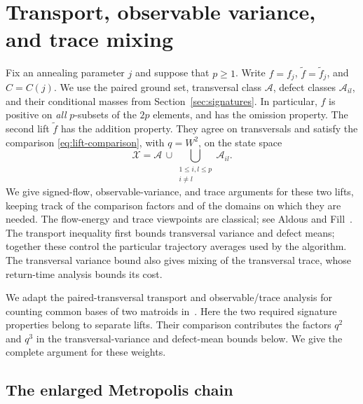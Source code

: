 \section{Transport, observable variance, and trace mixing}
\label{sec:transport}

Fix an annealing parameter $j$ and suppose that $p\geq 1$.
Write $f=f_j$, $\widetilde f=\widetilde f_j$, and $C=C(j)$.
We use the paired ground set, transversal class $\mathcal A$, defect
classes $\mathcal A_{il}$, and their conditional masses from
Section~\ref{sec:signatures}. In particular, $f$ is positive on
\emph{all} $p$-subsets of the $2p$ elements, and has the omission
property. The second lift $\widetilde f$ has the addition property.
They agree on transversals and satisfy the comparison
\eqref{eq:lift-comparison}, with $q=W^2$, on the state space
\[
  \mathcal X=\mathcal A\,\cup\!
       \bigcup_{\substack{1\leq i,l\leq p\\i\ne l}}\mathcal A_{il}.
\]
We give signed-flow, observable-variance, and trace arguments for these
two lifts, keeping track of the comparison factors and of the domains
on which they are needed. The flow-energy and trace viewpoints are
classical; see Aldous and Fill~\cite[Sections~2.7.1 and~3.7.1]{AF2002}.
The transport inequality first bounds transversal variance and defect
means; together these control the particular trajectory averages used
by the algorithm. The transversal variance bound also gives mixing
of the transversal trace, whose return-time analysis bounds its cost.

We adapt the paired-transversal transport and observable/trace analysis
for counting common bases of two matroids
in~\cite[Sections~4--6]{OpenAICommonBases2026}.
Here the two required signature properties belong to separate lifts.
Their comparison contributes the factors $q^2$ and $q^3$ in the
transversal-variance and defect-mean bounds below. We give the complete
argument for these weights.

\subsection{The enlarged Metropolis chain}

